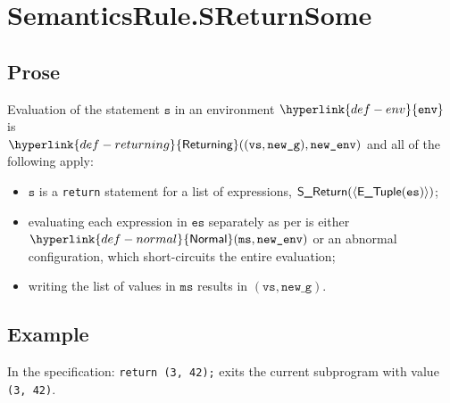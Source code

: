 \documentclass{book}
\newcommand\ProseOrAbnormal[0]{or an abnormal configuration, which short-circuits the entire evaluation}
\newcommand\Normal[0]{\hyperlink{def-normal}{\textsf{Normal}}}
\newcommand\Returning[0]{\hyperlink{def-returning}{\textsf{Returning}}}
\newcommand\env[0]{\hyperlink{def-env}{\texttt{env}}}
\newcommand\newg[0]{\texttt{new\_g}}
\newcommand\vs[0]{\texttt{s}}
\newcommand\vvs[0]{\texttt{vs}}
\newcommand\vms[0]{\texttt{ms}}
\newcommand\es[0]{\texttt{es}}
\newcommand\ms[0]{\texttt{ms}}
\begin{document}

\section{SemanticsRule.SReturnSome \label{sec:SemanticsRule.SReturnSome}}
    \subsection{Prose}
    Evaluation of the statement $\vs$ in an environment $\env$ is \\
    $\Returning((\vvs, \newg), \newenv)$ and all of the following apply:
    \begin{itemize}
    \item $\vs$ is a \texttt{return} statement for a list of expressions, $\SReturn(\langle\ETuple(\es)\rangle)$;
    \item evaluating each expression in $\es$ separately as per 
    is either \\ $\Normal(\ms, \newenv)$ \ProseOrAbnormal;
    \item writing the list of values in $\vms$ results in $(\vvs, \newg)$.
    \end{itemize}

    \subsection{Example}
    In the specification:
    \texttt{return (3, 42);} exits the current subprogram with value \texttt{(3, 42)}.


\end{document}
